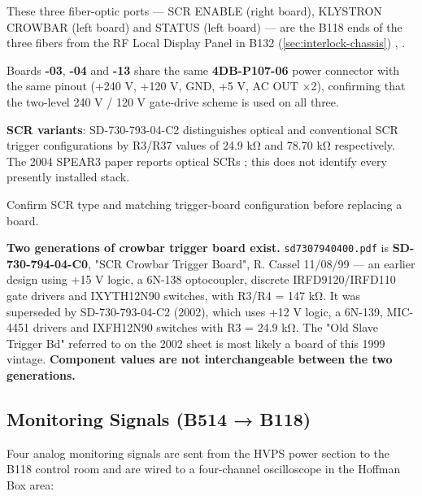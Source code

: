 These three fiber-optic ports --- SCR ENABLE (right board), KLYSTRON CROWBAR (left board) and STATUS (left board) --- are the B118 ends of the three fibers from the RF Local Display Panel in B132 (\cref{sec:interlock-chassis}) , .

Boards \textbf{-03}, \textbf{-04} and \textbf{-13} share the same \textbf{4DB-P107-06} power connector with the same pinout (+240 V, +120 V, GND, +5 V, AC OUT ×2), confirming that the two-level 240 V / 120 V gate-drive scheme is used on all three.

\begin{keynote}
\textbf{SCR variants}: SD-730-793-04-C2 distinguishes optical and conventional SCR trigger configurations by R3/R37 values of 24.9 kΩ and 78.70 kΩ respectively. The 2004 SPEAR3 paper reports optical SCRs ; this does not identify every presently installed stack.
\end{keynote}

Confirm SCR type and matching trigger-board configuration before replacing a board.


\begin{keynote}
\textbf{Two generations of crowbar trigger board exist.} \texttt{sd7307940400.pdf} is \textbf{SD-730-794-04-C0}, "SCR Crowbar Trigger Board", R. Cassel 11/08/99 --- an earlier design using +15 V logic, a 6N-138 optocoupler, discrete IRFD9120/IRFD110 gate drivers and IXYTH12N90 switches, with R3/R4 = 147 kΩ. It was superseded by SD-730-793-04-C2 (2002), which uses +12 V logic, a 6N-139, MIC-4451 drivers and IXFH12N90 switches with R3 = 24.9 kΩ. The "Old Slave Trigger Bd" referred to on the 2002 sheet is most likely a board of this 1999 vintage. \textbf{Component values are not interchangeable between the two generations.}
\end{keynote}


\subsection{Monitoring Signals (B514 → B118)}\label{sec:hvps-monitoring-signals}

Four analog monitoring signals are sent from the HVPS power section to the B118 control room and are wired to a four-channel oscilloscope in the Hoffman Box area:

